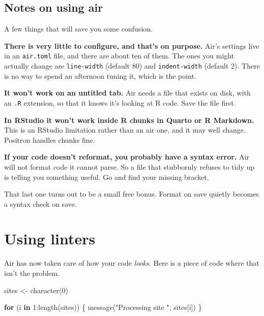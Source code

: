 \documentclass[
  letterpaper,
  justified,
  a4paper]{tufte-book}
\makeatletter
\newenvironment{Shaded}{\begin{snugshade}}{\end{snugshade}}
\newcommand{\ControlFlowTok}[1]{\textcolor[rgb]{0.00,0.23,0.31}{\textbf{#1}}}
\newcommand{\DecValTok}[1]{\textcolor[rgb]{0.68,0.00,0.00}{#1}}
\newcommand{\FunctionTok}[1]{\textcolor[rgb]{0.28,0.35,0.67}{#1}}
\newcommand{\NormalTok}[1]{\textcolor[rgb]{0.00,0.23,0.31}{#1}}
\newcommand{\OtherTok}[1]{\textcolor[rgb]{0.00,0.23,0.31}{#1}}
\newcommand{\SpecialCharTok}[1]{\textcolor[rgb]{0.37,0.37,0.37}{#1}}
\newcommand{\StringTok}[1]{\textcolor[rgb]{0.13,0.47,0.30}{#1}}
\let\rbporigShaded\Shaded
\let\rbporigendShaded\endShaded
\renewenvironment{Shaded}{%
  \begingroup
  \ifdim\linewidth=\rbpbodywidth
    \advance\linewidth by \@tufte@overhang
    \advance\hsize by \@tufte@overhang
    \advance\columnwidth by \@tufte@overhang
  \fi
  \rbporigShaded
}{%
  \rbporigendShaded
  \endgroup
}
\makeatother
\begin{document}
\subsection{Notes on using air}\label{notes-on-using-air}

A few things that will save you some confusion.

\textbf{There is very little to configure, and that's on purpose.} Air's
settings live in an \texttt{air.toml} file, and there are about ten of
them. The ones you might actually change are \texttt{line-width}
(default 80) and \texttt{indent-width} (default 2). There is no way to
spend an afternoon tuning it, which is the point.

\textbf{It won't work on an untitled tab.} Air needs a file that exists
on disk, with an \texttt{.R} extension, so that it knows it's looking at
R code. Save the file first.

\textbf{In RStudio it won't work inside R chunks in Quarto or R
Markdown.} This is an RStudio limitation rather than an air one, and it
may well change. Positron handles chunks fine.

\textbf{If your code doesn't reformat, you probably have a syntax
error.} Air will not format code it cannot parse. So a file that
stubbornly refuses to tidy up is telling you something useful. Go and
find your missing bracket.

That last one turns out to be a small free bonus. Format on save quietly
becomes a syntax check on save.

\section{Using linters}\label{using-linters}

Air has now taken care of how your code \emph{looks}. Here is a piece of
code where that isn't the problem.

\begin{Shaded}
\begin{Highlighting}[]
\NormalTok{sites }\OtherTok{\textless{}{-}} \FunctionTok{character}\NormalTok{(}\DecValTok{0}\NormalTok{)}

\ControlFlowTok{for}\NormalTok{ (i }\ControlFlowTok{in} \DecValTok{1}\SpecialCharTok{:}\FunctionTok{length}\NormalTok{(sites)) \{}
  \FunctionTok{message}\NormalTok{(}\StringTok{"Processing site "}\NormalTok{, sites[i])}
\NormalTok{\}}
\end{Highlighting}
\end{Shaded}
\end{document}
